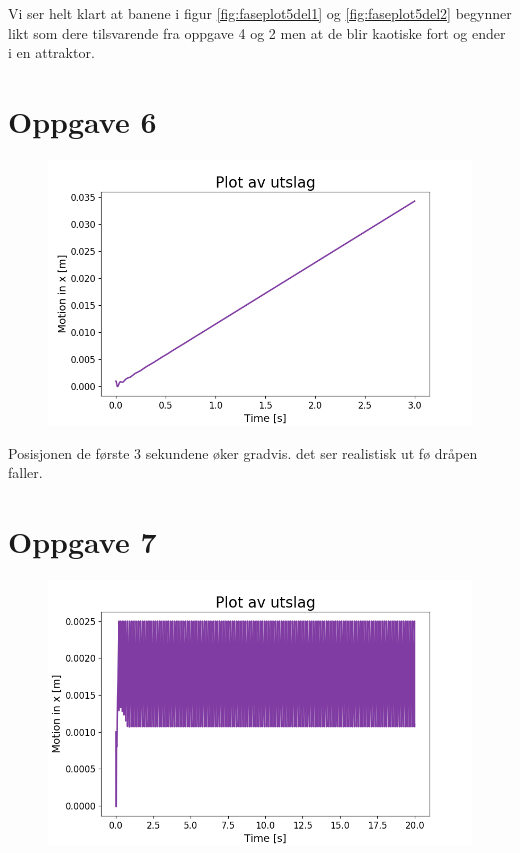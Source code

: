 \documentclass[norsk,a4paper,12pt]{article}
\begin{document}
Vi ser helt klart at banene i figur \ref{fig:faseplot5del1} og  \ref{fig:faseplot5del2} begynner likt som dere tilsvarende fra oppgave 4 og 2 men at de blir kaotiske fort og ender i en attraktor.

\section*{Oppgave 6}

\begin{figure}[H]
\begin{center}
\includegraphics[scale=0.5]{Oppgave6utslag.png}
\label{fig:faseplot5del2.png}
\end{center}
\end{figure}

Posisjonen de første 3 sekundene øker gradvis. det ser realistisk ut fø dråpen faller.


\section*{Oppgave 7}

\begin{figure}[H]
\begin{center}
\includegraphics[scale=0.5]{Oppgave7utslag.png}
\label{fig:faseplot5del2.png}
\end{center}
\end{figure}
\end{document}
